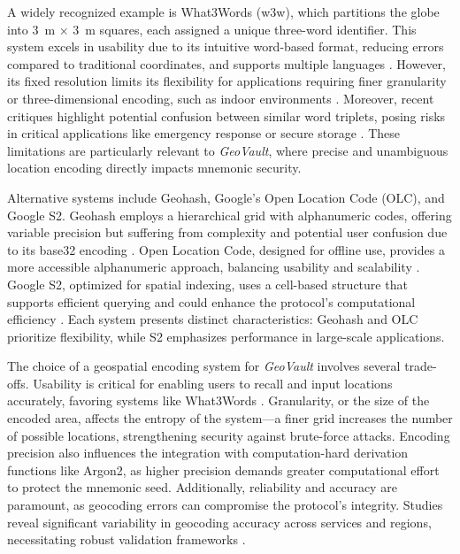 \documentclass[mathematics,article,accept,pdftex,moreauthors]{Definitions/mdpi}
\begin{document}
A widely recognized example is What3Words (w3w), which partitions the globe into 3~m $\times$
 3~m squares, each assigned a unique three-word identifier. This system excels in usability due to its intuitive word-based format, reducing errors compared to traditional coordinates, and supports multiple languages \cite{Jiang2018a}. However, its fixed resolution limits its flexibility for applications requiring finer granularity or three-dimensional encoding, such as indoor environments \cite{Lee2009}. Moreover, recent critiques highlight potential confusion between similar word triplets, posing risks in critical applications like emergency response or secure storage \cite{Arthur2023}. These limitations are particularly relevant to \textit{GeoVault}, where precise and unambiguous location encoding directly impacts mnemonic security.

Alternative systems include Geohash, Google's Open Location Code (OLC), and Google S2. Geohash employs a hierarchical grid with alphanumeric codes, offering variable precision but suffering from complexity and potential user confusion due to its base32 encoding \cite{Mai2022}. Open Location Code, designed for offline use, provides a more accessible alphanumeric approach, balancing usability and scalability \cite{Mai2022}. Google S2, optimized for spatial indexing, uses a cell-based structure that supports efficient querying and could enhance the protocol's computational efficiency \cite{Mai2022}. Each system presents distinct characteristics: Geohash and OLC prioritize flexibility, while S2 emphasizes performance in large-scale applications.

The choice of a geospatial encoding system for \textit{GeoVault} involves several trade-offs. Usability is critical for enabling users to recall and input locations accurately, favoring systems like What3Words \cite{Jiang2018a}. Granularity, or the size of the encoded area, affects the entropy of the system---a finer grid increases the number of possible locations, strengthening security against brute-force attacks. Encoding precision also influences the integration with computation-hard derivation functions like Argon2, as higher precision demands greater computational effort to protect the mnemonic seed. Additionally, reliability and accuracy are paramount, as geocoding errors can compromise the protocol's integrity. Studies reveal significant variability in geocoding accuracy across services and regions, necessitating robust validation frameworks \cite{Goldberg2013, Zandbergen2008a}.
\end{document}
